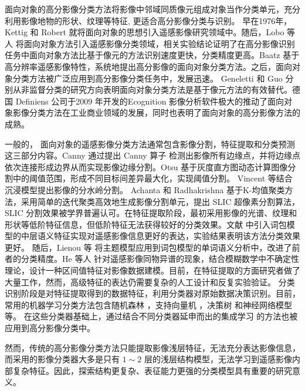 面向对象的高分影像分类方法将影像中邻域同质像元组成对象当作分类单元，充分利用影像地物的形状、纹理等特征, 更适合高分影像分类与识别\cite{zhangyongsheng2004}。 早在1976年，Kettig 和 Robert \cite{kettig1976classification} 就将面向对象的思想引入遥感影像研究领域中。随后，Lobo 等人 \cite{lobo1996classification} 将面向对象方法引入遥感影像分类领域，相关实验结论证明了在高分影像识别任务中面向对象方法比基于像元的方法识别速度更快，分类精度更高。Baatz \cite{baatz1999object} 基于高分辨率遥感影像特性，系统地提出高分影像的面向对象分类方法。之后，面向对象分类方法被广泛应用到高分影像分类任务中，发展迅速。 Geneletti \cite{geneletti2003method} 和 Guo \cite{guo2007object} 分别从非监督分类的研究方向表明面向对象分类方法是基于像元方法的有效替代。德国 Definiens 公司于2009 年开发的Ecognition 影像分析软件极大的推动了面向对象影像分类方法在工业商业领域的发展，同时也表明了面向对象的高分影像方法的成熟。

一般的， 面向对象的遥感影像分类方法通常包含影像分割，特征提取和分类预测这三部分内容。Canny 通过提出 Canny 算子 \cite{canny1987computational} 检测出影像所有边缘点，并将边缘点依次连接形成边界从而实现影像边缘分割。Otsu 基于灰度直方图动态计算图像分割中的阈值范围，形成不同目标间差异最大化，实现阈值分割\cite{otsu1979threshold}。 Vincent \cite{vincent1991watersheds} 等结合沉浸模型提出影像的分水岭分割。 Achanta 和 Radhakrishna \cite{achanta2012slic} 基于K-均值聚类方法，采用简单的迭代聚类高效地生成影像分割单元，提出 SLIC 超像素分割算法，SLIC 分割效果被学界普遍认可。在特征提取阶段，最初采用影像的光谱、纹理和形状等低阶特征信息，但低阶特征无法获得较好的分类效果。文献 \cite{weizman2009urban} 中引入词包模型的中层语义特征实现对遥感影像信息更好的表达，实验结果表明该方法分类效果更好。 随后，Lienou 等\cite{lienou2010semantic} 将主题模型应用到词包模型的单词语义分析中，改进了前者的分类精度。He 等人 \cite{he2016remote} 针对遥感影像同物异谱的现象，结合模糊数学中不确定性理论，设计一种区间值特征对影像数据建模。目前，在特征提取的方面研究者做了大量工作，然而，高级特征的表达仍需要复杂的人工设计和反复实验验证。 分类识别阶段是对特征提取得到的数据特征，利用分类器对原始数据决策识别。目前，常用的机器学习分类方法包含随机森林 \cite{pal2005random}，支持向量机 \cite{suykens1999least} ，决策树 \cite{friedl1997decision} 和神经网络模型 \cite{haykin1994neural} 等。 在这些分类器基础上，通过结合不同分类器延申而出的集成学习 \cite{freund1996experiments} 的方法也被应用到高分影像分类中。

然而，传统的高分影像分类方法只能提取影像浅层特征，无法充分表达影像信息，而采用的影像分类器大多是只有 $1\sim2$ 层的浅层结构模型，无法学习到遥感影像内部复杂特征。因此，探索结构更复杂、表征能力更强的分类模型具有重要的研究意义。

